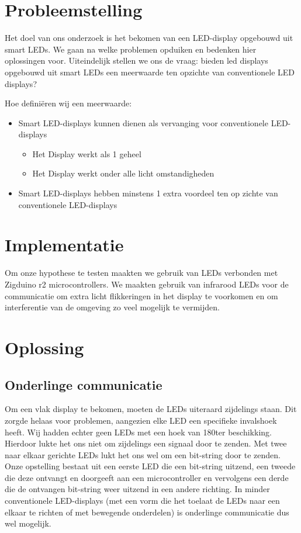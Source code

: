 \documentclass{article}
\begin{document}
\section{Probleemstelling}

Het doel van ons onderzoek is het bekomen van een LED-display opgebouwd uit smart LEDs. We gaan na welke problemen opduiken en bedenken hier oplossingen voor. Uiteindelijk stellen we ons de vraag: bieden led displays opgebouwd uit smart LEDs een meerwaarde ten opzichte van conventionele LED displays? 

\smallskip

Hoe definiëren wij een meerwaarde:
\begin{itemize}
\item Smart LED-displays kunnen dienen als vervanging voor conventionele LED-displays
\begin{itemize}
\item Het Display werkt als 1 geheel
\item Het Display werkt onder alle licht omstandigheden
\end{itemize}
\item Smart LED-displays hebben minstens 1 extra voordeel ten op zichte van conventionele LED-displays
\end{itemize}

\smallskip




\section{Implementatie}
Om onze hypothese te testen maakten we gebruik van LEDs verbonden met Zigduino r2 microcontrollers. We maakten gebruik van infrarood LEDs voor de communicatie om extra licht flikkeringen in het display te voorkomen en om interferentie van de omgeving zo veel mogelijk te vermijden.


\section{Oplossing}

\subsection{Onderlinge communicatie}
Om een vlak display te bekomen, moeten de LEDs uiteraard zijdelings staan. Dit zorgde helaas voor problemen, aangezien elke LED een specifieke invalshoek heeft. Wij hadden echter geen LEDs met een hoek van 180\degree ter beschikking. Hierdoor lukte het ons niet om zijdelings een signaal door te zenden. 
Met twee naar elkaar gerichte LEDs lukt het ons wel om een bit-string door te zenden. Onze opstelling bestaat uit een eerste LED die een bit-string uitzend, een tweede die deze ontvangt en doorgeeft aan een microcontroller en vervolgens een derde die de ontvangen bit-string weer uitzend in een andere richting. 
In minder conventionele LED-displays (met een vorm die het toelaat de LEDs naar een elkaar te richten of met bewegende onderdelen) is onderlinge communicatie dus wel mogelijk.
\end{document}
